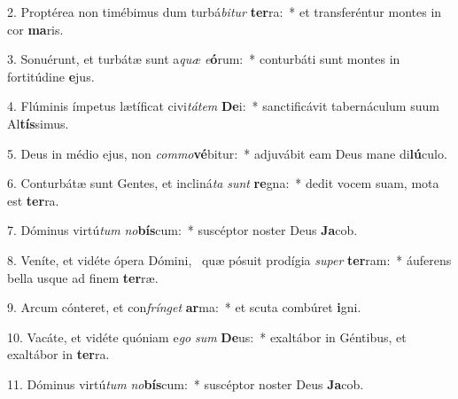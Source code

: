 2. Proptérea non timébimus dum turbá\textit{bi}\textit{tur} \textbf{ter}ra:~*  et transferéntur montes in cor \textbf{ma}ris.\

3. Sonuérunt, et turbátæ sunt a\textit{quæ} \textit{e}\textbf{ó}rum:~*  conturbáti sunt montes in fortitúdine \textbf{e}jus.\

4. Flúminis ímpetus lætíficat civi\textit{tá}\textit{tem} \textbf{De}i:~*  sanctificávit tabernáculum suum Al\textbf{tís}simus.\

5. Deus in médio ejus, non \textit{com}\textit{mo}\textbf{vé}bitur:~*  adjuvábit eam Deus mane di\textbf{lú}culo.\

6. Conturbátæ sunt Gentes, et incliná\textit{ta} \textit{sunt} \textbf{re}gna:~*  dedit vocem suam, mota est \textbf{ter}ra.\

7. Dóminus virtú\textit{tum} \textit{no}\textbf{bís}cum:~*  suscéptor noster Deus \textbf{Ja}cob.\

8. Veníte, et vidéte ópera Dómini, \dag\  quæ pósuit prodígia \textit{su}\textit{per} \textbf{ter}ram:~*  áuferens bella usque ad finem \textbf{ter}ræ.\

9. Arcum cónteret, et con\textit{frín}\textit{get} \textbf{ar}ma:~*  et scuta combúret \textbf{i}gni.\

10. Vacáte, et vidéte quóniam e\textit{go} \textit{sum} \textbf{De}us:~*  exaltábor in Géntibus, et exaltábor in \textbf{ter}ra.\

11. Dóminus virtú\textit{tum} \textit{no}\textbf{bís}cum:~*  suscéptor noster Deus \textbf{Ja}cob.\

